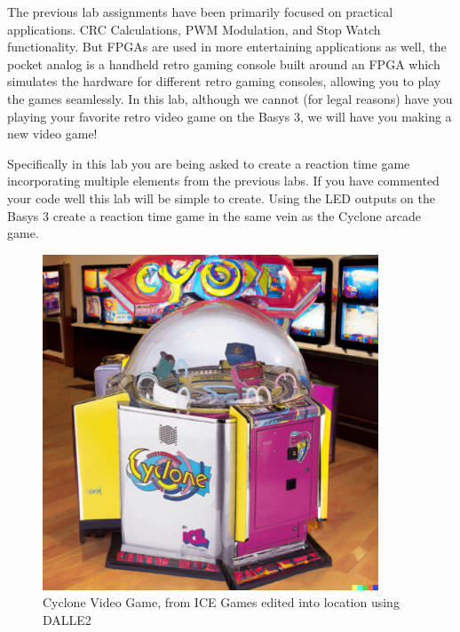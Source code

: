 The previous lab assignments have been primarily focused on practical applications. CRC Calculations, PWM Modulation, and Stop Watch functionality. But FPGAs are used in more entertaining applications as well, the pocket analog is a handheld retro gaming console built around an FPGA which simulates the hardware for different retro gaming consoles, allowing you to play the games seamlessly. In this lab, although we cannot (for legal reasons) have you playing your favorite retro video game on the Basys 3, we will have you making a new video game!

\vspace{0.5cm}
Specifically in this lab you are being asked to create a reaction time game incorporating multiple elements from the previous labs. If you have commented your code well this lab will be simple to create. Using the LED outputs on the Basys 3 create a reaction time game in the same vein as the Cyclone arcade game.
\begin{figure}[H]
    \centering
    \includegraphics[width = 10cm]{Images/Cyclone (2).png}
    \caption{Cyclone Video Game, from ICE Games edited into location using DALLE2}
    \label{fig:enter-label}
\end{figure}